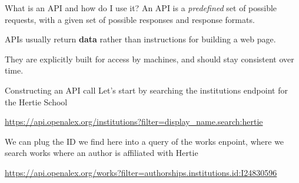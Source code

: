 \documentclass[
  10pt,
  ignorenonframetext,
  aspectratio=169]{beamer}
\begin{document}
\begin{frame}{What is an API and how do I use it?}
\protect\hypertarget{what-is-an-api-and-how-do-i-use-it}{}
An API is a \emph{predefined} set of possible requests, with a given set
of possible responses and response formats.

APIs usually return \textbf{data} rather than instructions for building
a web page.

They are explicitly built for access by machines, and should stay
consistent over time.

\medskip

\end{frame}

\begin{frame}{Constructing an API call}
\protect\hypertarget{constructing-an-api-call}{}
Let's start by searching the institutions endpoint for the Hertie School

\url{https://api.openalex.org/institutions?filter=display_name.search:hertie}

We can plug the ID we find here into a query of the works enpoint, where
we search works where an author is affiliated with Hertie

\url{https://api.openalex.org/works?filter=authorships.institutions.id:I24830596}
\end{frame}
\end{document}
